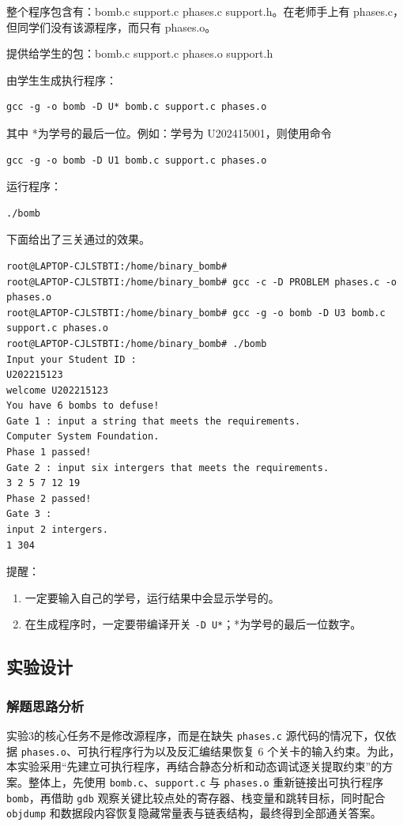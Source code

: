 \documentclass[supercite]{Experimental_Report}
\theoremstyle{definition}
\begin{document}
整个程序包含有：bomb.c support.c phases.c support.h。在老师手上有 phases.c，但同学们没有该源程序，而只有 phases.o。

提供给学生的包：bomb.c support.c phases.o support.h

由学生生成执行程序：

\begin{lstlisting}[language=Shell]
gcc -g -o bomb -D U* bomb.c support.c phases.o
\end{lstlisting}

其中 *为学号的最后一位。例如：学号为 U202415001，则使用命令

\begin{lstlisting}[language=Shell]
gcc -g -o bomb -D U1 bomb.c support.c phases.o
\end{lstlisting}

运行程序：

\begin{lstlisting}[language=Shell]
./bomb
\end{lstlisting}

下面给出了三关通过的效果。

\begin{lstlisting}[language={}]
root@LAPTOP-CJLSTBTI:/home/binary_bomb#
root@LAPTOP-CJLSTBTI:/home/binary_bomb# gcc -c -D PROBLEM phases.c -o phases.o
root@LAPTOP-CJLSTBTI:/home/binary_bomb# gcc -g -o bomb -D U3 bomb.c support.c phases.o
root@LAPTOP-CJLSTBTI:/home/binary_bomb# ./bomb
Input your Student ID :
U202215123
welcome U202215123
You have 6 bombs to defuse!
Gate 1 : input a string that meets the requirements.
Computer System Foundation.
Phase 1 passed!
Gate 2 : input six intergers that meets the requirements.
3 2 5 7 12 19
Phase 2 passed!
Gate 3 :
input 2 intergers.
1 304
\end{lstlisting}

提醒：
\begin{enumerate}
  \item 一定要输入自己的学号，运行结果中会显示学号的。
  \item 在生成程序时，一定要带编译开关 \texttt{-D U*}；*为学号的最后一位数字。
\end{enumerate}

\subsection{实验设计}
\subsubsection{解题思路分析}
实验3的核心任务不是修改源程序，而是在缺失 \texttt{phases.c} 源代码的情况下，仅依据 \texttt{phases.o}、可执行程序行为以及反汇编结果恢复 6 个关卡的输入约束。为此，本实验采用“先建立可执行程序，再结合静态分析和动态调试逐关提取约束”的方案。整体上，先使用 \texttt{bomb.c}、\texttt{support.c} 与 \texttt{phases.o} 重新链接出可执行程序 \texttt{bomb}，再借助 \texttt{gdb} 观察关键比较点处的寄存器、栈变量和跳转目标，同时配合 \texttt{objdump} 和数据段内容恢复隐藏常量表与链表结构，最终得到全部通关答案。
\end{document}
